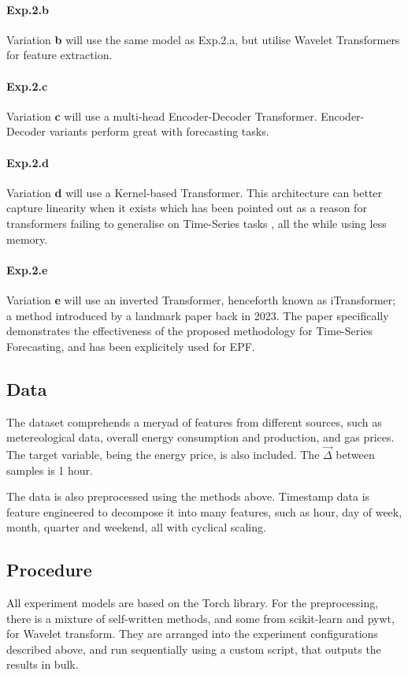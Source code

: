 \paragraph{Exp.2.b}
Variation \textbf{b} will use the same model as Exp.2.a, but utilise Wavelet Transformers for feature extraction\cite{Yemets2025}.

\paragraph{Exp.2.c}
Variation \textbf{c} will use a multi-head Encoder-Decoder Transformer. Encoder-Decoder variants perform great with forecasting tasks\cite{Hussan2026-dy}.

\paragraph{Exp.2.d}
Variation \textbf{d} will use a Kernel-based Transformer. This architecture can better capture linearity when it exists\cite{su2019kernel} which has been pointed out as a reason for transformers failing to generalise on Time-Series tasks\cite{curseOfAttention}
, all the while using less memory.

\paragraph{Exp.2.e}
Variation \textbf{e} will use an inverted Transformer, henceforth known as iTransformer; a method introduced by a landmark paper back in 2023\cite{iTrans}. The paper specifically demonstrates the effectiveness of the 
proposed methodology for Time-Series Forecasting, and has been explicitely used for EPF\cite{Wang2026}.

\subsection{Data}
The dataset comprehends a meryad of features from different sources, such as metereological data, overall energy consumption and production, and gas prices. The target variable, being the energy price, is also included.
The $\vec{\Delta}$ between samples is 1 hour.

The data is also preprocessed using the methods above. Timestamp data is feature engineered to decompose it into many features, such as hour, day of week, month, quarter and weekend, all with cyclical scaling.

\subsection{Procedure}
All experiment models are based on the Torch library. For the preprocessing, there is a mixture of self-written methods, and some from scikit-learn and pywt, for Wavelet transform.
They are arranged into the experiment configurations described above, and run sequentially using a custom script, that outputs the results in bulk.

